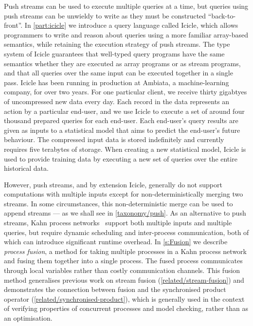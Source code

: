 Push streams can be used to execute multiple queries at a time, but queries using push streams can be unwieldy to write as they must be constructed ``back-to-front''.
In \cref{part:icicle} we introduce a query language called Icicle, which allows programmers to write and reason about queries using a more familiar array-based semantics, while retaining the execution strategy of push streams.
The type system of Icicle guarantees that well-typed query programs have the same semantics whether they are executed as array programs or as stream programs, and that all queries over the same input can be executed together in a single pass.
Icicle has been running in production at Ambiata, a machine-learning company, for over two years.
For one particular client, we receive thirty gigabtyes of uncompressed new data every day.
Each record in the data represents an action by a particular end-user, and we use Icicle to execute a set of around four thousand prepared queries for each end-user.
Each end-user's query results are given as inputs to a statistical model that aims to predict the end-user's future behaviour.
The compressed input data is stored indefinitely and currently requires five terabytes of storage.
When creating a new statistical model, Icicle is used to provide training data by executing a new set of queries over the entire historical data.

However, push streams, and by extension Icicle, generally do not support computations with multiple inputs except for non-deterministically merging two streams.
In some circumstances, this non-deterministic merge can be used to append streams --- as we shall see in \cref{taxonomy/push}.
As an alternative to push streams, Kahn process networks~\citep{kahn1976coroutines} support both multiple inputs and multiple queries, but require dynamic scheduling and inter-process communication, both of which can introduce significant runtime overhead.
In \cref{s:Fusion} we describe \emph{process fusion}, a method for taking multiple processes in a Kahn process network and fusing them together into a single process.
The fused process communicates through local variables rather than costly communication channels.
This fusion method generalises previous work on stream fusion (\cref{related/stream-fusion}) and demonstrates the connection between fusion and the synchronised product operator (\cref{related/synchronised-product}), which is generally used in the context of verifying properties of concurrent processes and model checking, rather than as an optimisation.

